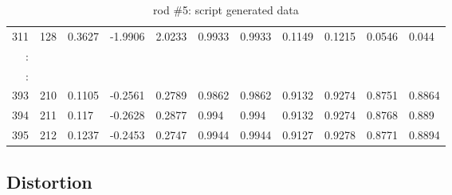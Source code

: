 \begin{table}[p]
{\begin{minipage}{\textheight}
\begin{tabular}{rr|lll|ll|llll}
 311    & 128 			& 0.3627 			& -1.9906			& 2.0233					& 0.9933	& 0.9933		& 0.1149	& 0.1215		& 0.0546			& 0.044 			\\
 :      &     			&        			&        			&       					&       	&       		&       	&       		&       			&       			\\
 \hline
 :      &     			&        			&        			&       					&       	&       		&       	&       		&       			&       			\\
 393    & 210 			& 0.1105 			& -0.2561			& 0.2789					& 0.9862	& 0.9862		& 0.9132	& 0.9274		& 0.8751			& 0.8864			\\
 394    & 211 			& 0.117  			& -0.2628			& 0.2877					& 0.994 	& 0.994 		& 0.9132	& 0.9274		& 0.8768			& 0.889 			\\
 395    & 212 			& 0.1237 			& -0.2453			& 0.2747					& 0.9944	& 0.9944		& 0.9127	& 0.9278		& 0.8771			& 0.8894			 
 \end{tabular}
        \caption{rod \#5: script generated data}
        \label{tab:spit-out}
      \end{minipage}
    }
  \end{table}
 


\subsection{Distortion}
\label{sec:distortion}


